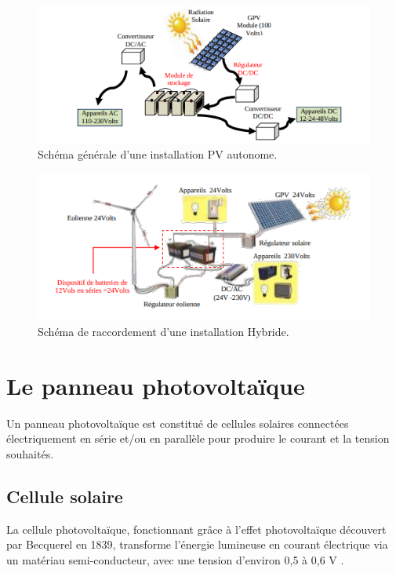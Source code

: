 \begin{figure}[H]
	\centering
	\includegraphics[width=14cm]{./img/standAlone.png}
	\caption{Schéma générale d’une installation PV autonome.}
	\label{i1}
\end{figure}

\begin{figure}[H]
	\centering
	\includegraphics[width=14cm]{./img/hybrid.png}
	\caption{Schéma de raccordement d’une installation Hybride.}
	\label{i1}
\end{figure}


\section{Le panneau photovoltaïque}
Un panneau photovoltaïque est constitué de cellules solaires connectées électriquement en série et/ou en parallèle pour produire le courant et la tension souhaités.

\subsection{Cellule solaire}
La cellule photovoltaïque, fonctionnant grâce à l'effet photovoltaïque découvert par Becquerel en 1839, transforme l'énergie lumineuse en courant électrique via un matériau semi-conducteur, avec une tension d'environ 0,5 à 0,6 V \cite{l3}.\\

